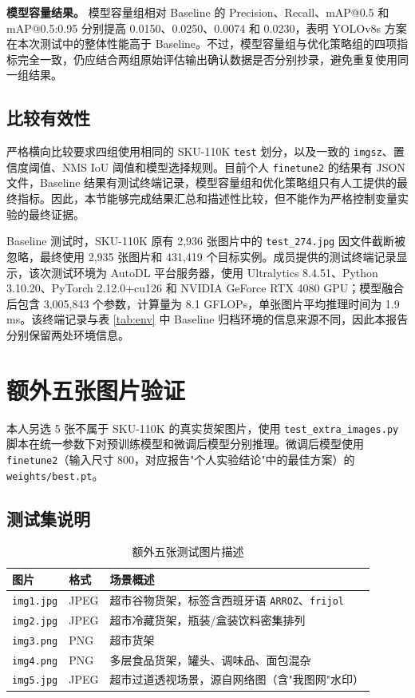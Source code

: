 \documentclass[12pt,a4paper]{ctexart}
\begin{document}
\textbf{模型容量结果。} 模型容量组相对 Baseline 的 Precision、Recall、mAP@0.5 和 mAP@0.5:0.95 分别提高 0.0150、0.0250、0.0074 和 0.0230，表明 YOLOv8s 方案在本次测试中的整体性能高于 Baseline。不过，模型容量组与优化策略组的四项指标完全一致，仍应结合两组原始评估输出确认数据是否分别抄录，避免重复使用同一组结果。

\subsection{比较有效性}

严格横向比较要求四组使用相同的 SKU-110K \texttt{test} 划分，以及一致的 \texttt{imgsz}、置信度阈值、NMS IoU 阈值和模型选择规则。目前个人 \texttt{finetune2} 的结果有 JSON 文件，Baseline 结果有测试终端记录，模型容量组和优化策略组只有人工提供的最终指标。因此，本节能够完成结果汇总和描述性比较，但不能作为严格控制变量实验的最终证据。

Baseline 测试时，SKU-110K 原有 2,936 张图片中的 \texttt{test\_274.jpg} 因文件截断被忽略，最终使用 2,935 张图片和 431,419 个目标实例。成员提供的测试终端记录显示，该次测试环境为 AutoDL 平台服务器，使用 Ultralytics 8.4.51、Python 3.10.20、PyTorch 2.12.0+cu126 和 NVIDIA GeForce RTX 4080 GPU；模型融合后包含 3,005,843 个参数，计算量为 8.1 GFLOPs，单张图片平均推理时间为 1.9 ms。该终端记录与表 \ref{tab:env} 中 Baseline 归档环境的信息来源不同，因此本报告分别保留两处环境信息。

\section{额外五张图片验证}

本人另选 5 张不属于 SKU-110K 的真实货架图片，使用 \texttt{test\_extra\_images.py} 脚本在统一参数下对预训练模型和微调后模型分别推理。微调后模型使用 \texttt{finetune2}（输入尺寸 800，对应报告"个人实验结论"中的最佳方案）的 \texttt{weights/best.pt}。

\subsection{测试集说明}

\begin{table}[H]
\centering
\caption{额外五张测试图片描述}
\begin{tabular}{lll}
\toprule
\textbf{图片} & \textbf{格式} & \textbf{场景概述} \\
\midrule
\texttt{img1.jpg} & JPEG & 超市谷物货架，标签含西班牙语 \texttt{ARROZ}、\texttt{frijol} \\
\texttt{img2.jpg} & JPEG & 超市冷藏货架，瓶装/盒装饮料密集排列 \\
\texttt{img3.png} & PNG  & 超市货架 \\
\texttt{img4.png} & PNG  & 多层食品货架，罐头、调味品、面包混杂 \\
\texttt{img5.jpg} & JPEG & 超市过道透视场景，源自网络图（含"我图网"水印） \\
\bottomrule
\end{tabular}
\end{table}
\end{document}
